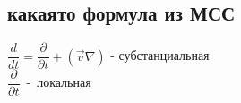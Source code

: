 




	\small
	\begin{multicols*}{5}
		\section{какаято формула из МСС}
		$\dfrac{d}{dt}=\dfrac{\partial}{\partial t}+(\vec{v}\nabla)$ - субстанциальная \\
		$\dfrac{\partial}{\partial t}$~-~локальная
	\end{multicols*}
